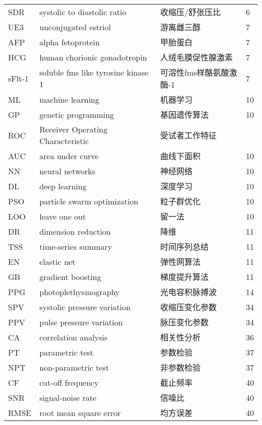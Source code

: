 \begin{center}
\begin{longtable}{m{2cm}m{7cm}m{5cm}m{1cm}<{\centering}}
        SDR     &  systolic to diastolic ratio & 收缩压/舒张压比 & 6\\
        UE3     & unconjugated estriol & 游离雌三醇 & 7\\
        AFP     & alpha fetoprotein     & 甲胎蛋白 & 7 \\
        HCG     & human chorionic gonadotropin  & 人绒毛膜促性腺激素    & 7 \\
        sFlt-1  & soluble fms like tyrosine kinase 1    & 可溶性fms样酪氨酸激酶-1 & 7\\
        ML     & machine learning  & 机器学习  & 10    \\
        GP  & genetic programming   & 基因遗传算法  &10 \\
        ROC & Receiver Operating Characteristic & 受试者工作特征 \\
        AUC & area under curve & 曲线下面积 & 10 \\
        NN & neural networks & 神经网络 & 10 \\
        DL & deep learning & 深度学习 & 10 \\
        PSO & particle swarm optimization & 粒子群优化 & 10 \\
        LOO & leave one out & 留一法 & 10 \\
        DR  & dimension reduction & 降维 & 11 \\
        TSS & time-series summary & 时间序列总结 & 11 \\
        EN & elastic net  & 弹性网算法 & 11 \\
        GB &  gradient boosting  & 梯度提升算法 & 11 \\
        PPG & photoplethysmography & 光电容积脉搏波 & 14 \\


        SPV & systolic pressure variation & 收缩压变化参数 & 34 \\
        PPV & pulse pressure variation & 脉压变化参数 & 34 \\
        CA  & correlation analysis & 相关性分析 & 36 \\
        PT  & parametric test & 参数检验 & 37 \\
        NPT & non-parametric test & 非参数检验 & 37 \\
        CF  & cut-off frequency & 截止频率 & 40 \\
        SNR & signal-noise rate & 信噪比 & 40 \\
        RMSE & root mean square error & 均方误差 & 40 \\




\end{longtable}
\end{center}
